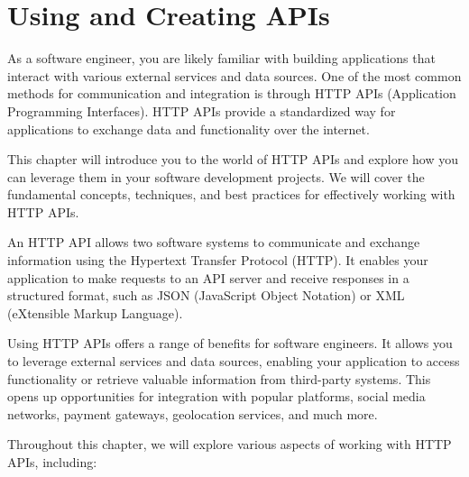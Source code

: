 \chapter{Using and Creating APIs}

As a software engineer, you are likely familiar with building applications that interact with various external services and data sources. One of the most common methods for communication and integration is through HTTP APIs (Application Programming Interfaces). HTTP APIs provide a standardized way for applications to exchange data and functionality over the internet.

This chapter will introduce you to the world of HTTP APIs and explore how you can leverage them in your software development projects. We will cover the fundamental concepts, techniques, and best practices for effectively working with HTTP APIs.

An HTTP API allows two software systems to communicate and exchange information using the Hypertext Transfer Protocol (HTTP). It enables your application to make requests to an API server and receive responses in a structured format, such as JSON (JavaScript Object Notation) or XML (eXtensible Markup Language).

Using HTTP APIs offers a range of benefits for software engineers. It allows you to leverage external services and data sources, enabling your application to access functionality or retrieve valuable information from third-party systems. This opens up opportunities for integration with popular platforms, social media networks, payment gateways, geolocation services, and much more.

Throughout this chapter, we will explore various aspects of working with HTTP APIs, including:

